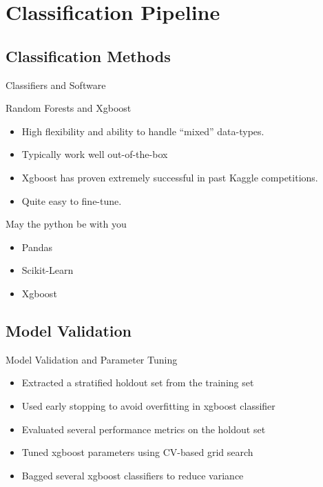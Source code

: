 \section{Classification Pipeline}

\subsection{Classification Methods}
	
\begin{frame}[t]{Classifiers and Software}
	
	\begin{alertblock}{Random Forests and Xgboost}
		\begin{itemize}
			\item High flexibility and ability to handle ``mixed'' data-types.
			\item Typically work well out-of-the-box
			\item Xgboost has proven extremely successful in past Kaggle
				competitions. 
			\item Quite easy to fine-tune. 
		\end{itemize}
	\end{alertblock}
	\begin{block}{May the python be with you}
		\begin{itemize}
			\item Pandas
			\item Scikit-Learn 
			\item Xgboost
		\end{itemize}
	\end{block}
\end{frame}

\subsection{Model Validation}

\begin{frame}[c]{Model Validation and Parameter Tuning}
	\begin{itemize}
		\item Extracted a stratified holdout set from the training set
		\item Used early stopping to avoid overfitting in xgboost classifier
		\item Evaluated several performance metrics on the holdout set
		\item Tuned xgboost parameters using CV-based grid search
		\item Bagged several xgboost classifiers to reduce variance
	\end{itemize}
\end{frame}

